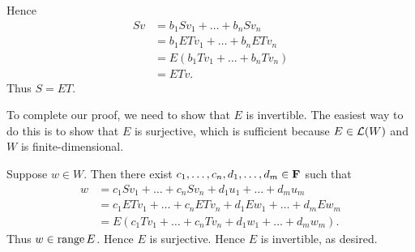 \documentclass[a5paper]{article}
\begin{document}
    Hence
\begin{align*}
        Sv &= b_1Sv_1 + \dots + b_nSv_n \\
           &= b_1ETv_1 + \dots + b_nETv_n \\
           &= E(b_1Tv_1 + \dots + b_nTv_n) \\
           &= ETv .
\end{align*}
    Thus $S = ET$.

    To complete our proof, we need to show that $E$ is invertible.
    The easiest way to do this is to show that $E$ is surjective, which is sufficient because $E \in \mathcal{L}(W)$ and $W$ is finite-dimensional.

    Suppose $w \in W$.
    Then there exist $c_1,\dots,c_n,d_1,\dots,d_m \in \mathbf{F}$ such that
\begin{align*}
        w &= c_1Sv_1 + \dots + c_nSv_n + d_1u_1 + \dots + d_mu_m \\
          &= c_1ETv_1 + \dots + c_nETv_n + d_1Ew_1 + \dots + d_mEw_m \\
          &= E(c_1Tv_1 + \dots + c_nTv_n + d_1w_1 + \dots + d_mw_m ) .
\end{align*}
    Thus $w \in \operatorname{range}E$.
    Hence $E$ is surjective.
    Hence $E$ is invertible, as desired.
\end{document}
